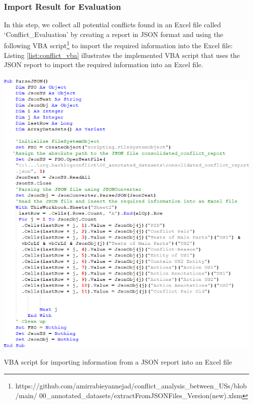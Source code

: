 \subsubsection*{Import Result for Evaluation}
In this step, we collect all potential conflicts found in an Excel file called ‘Conflict\_Evaluation’ by creating a report in JSON format and using the following VBA script\footnote{https://github.com/amirrabieyannejad/conflict\_analysis\_between\_USs/blob/main/ 00\_annotated\_datasets/extractFromJSONFiles\_Version(new).xlsm} to import the required information into the Excel file:
Listing \ref{list:conflict_vba} illustrates the implemented VBA script that uses the JSON report to import the required information into an Excel file.
\begin{MyListing}
	\paragraph{}
	\centering
	\includegraphics[scale=0.7]{Listing/conflict_vba.png}
	\caption{VBA script for importing information from a JSON report into an Excel file}\label{list:conflict_vba}
\end{MyListing}	
